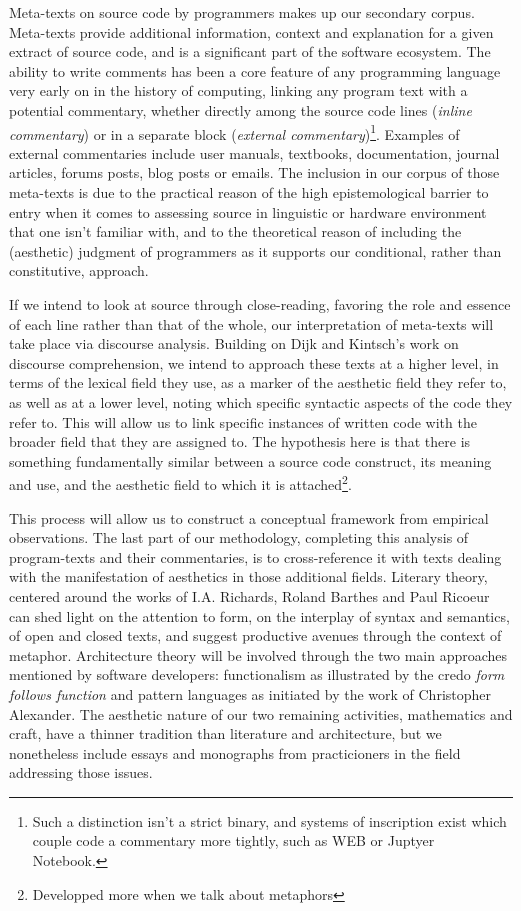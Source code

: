 Meta-texts on source code by programmers makes up our secondary corpus. Meta-texts provide additional information, context and explanation for a given extract of source code, and is a significant part of the software ecosystem. The ability to write comments has been a core feature of any programming language very early on in the history of computing, linking any program text with a potential commentary, whether directly among the source code lines (\emph{inline commentary}) or in a separate block (\emph{external commentary})\footnote{Such a distinction isn't a strict binary, and systems of inscription exist which couple code a commentary more tightly, such as WEB or Juptyer Notebook.}. Examples of external commentaries include user manuals, textbooks, documentation, journal articles, forums posts, blog posts or emails. The inclusion in our corpus of those meta-texts is due to the practical reason of the high epistemological barrier to entry when it comes to assessing source in linguistic or hardware environment that one isn't familiar with, and to the theoretical reason of including the (aesthetic) judgment of programmers as it supports our conditional, rather than constitutive, approach.

If we intend to look at source through close-reading, favoring the role and essence of each line rather than that of the whole, our interpretation of meta-texts will take place via discourse analysis. Building on Dijk and Kintsch's work on discourse comprehension\cite{dijk_strategies_1983}, we intend to approach these texts at a higher level, in terms of the lexical field they use, as a marker of the aesthetic field they refer to, as well as at a lower level, noting which specific syntactic aspects of the code they refer to. This will allow us to link specific instances of written code with the broader field that they are assigned to. The hypothesis here is that there is something fundamentally similar between a source code construct, its meaning and use, and the aesthetic field to which it is attached\footnote{Developped more when we talk about metaphors}.

This process will allow us to construct a conceptual framework from empirical observations. The last part of our methodology, completing this analysis of program-texts and their commentaries, is to cross-reference it with texts dealing with the manifestation of aesthetics in those additional fields. Literary theory, centered around the works of I.A. Richards, Roland Barthes and Paul Ricoeur can shed light on the attention to form, on the interplay of syntax and semantics, of open and closed texts, and suggest productive avenues through the context of metaphor. Architecture theory will be involved through the two main approaches mentioned by software developers: functionalism as illustrated by the credo \emph{form follows function} and pattern languages as initiated by the work of Christopher Alexander. The aesthetic nature of our two remaining activities, mathematics and craft, have a thinner tradition than literature and architecture, but we nonetheless include essays and monographs from practicioners in the field addressing those issues.

